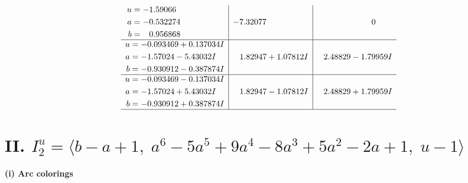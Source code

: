 \documentclass[1p]{elsarticle_modified}
\theoremstyle{definition}
\begin{document}
$$\begin{array}{c|c|c}
\begin{aligned}
u &= -1.59066\phantom{ +0.000000I} \\
a &= -0.532274\phantom{ +0.000000I} \\
b &= \phantom{-}0.956868\phantom{ +0.000000I}\end{aligned}
 & -7.32077\phantom{ +0.000000I} & \phantom{-0.000000 } 0 \\ \hline\begin{aligned}
u &= -0.093469 + 0.137034 I \\
a &= -1.57024 - 5.43032 I \\
b &= -0.930912 - 0.387874 I\end{aligned}
 & \phantom{-}1.82947 + 1.07812 I & \phantom{-}2.48829 - 1.79959 I \\ \hline\begin{aligned}
u &= -0.093469 - 0.137034 I \\
a &= -1.57024 + 5.43032 I \\
b &= -0.930912 + 0.387874 I\end{aligned}
 & \phantom{-}1.82947 - 1.07812 I & \phantom{-}2.48829 + 1.79959 I\\
 \hline 
 \end{array}$$\newpage\newpage\renewcommand{\arraystretch}{1}
\centering \section*{II. $I^u_{2}= \langle b- a+1,\;a^6-5 a^5+9 a^4-8 a^3+5 a^2-2 a+1,\;u-1 \rangle$}
\flushleft \textbf{(i) Arc colorings}\\
\end{document}
